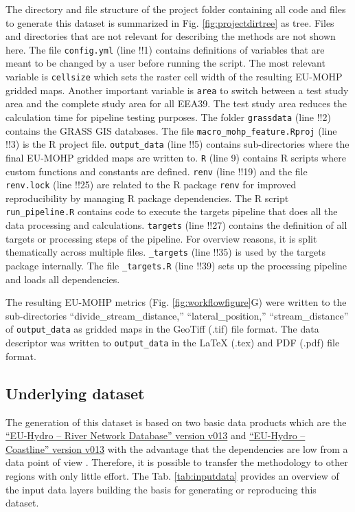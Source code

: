 \documentclass[fleqn,10pt]{wlscirep}
\begin{document}
The directory and file structure of the project folder containing all code and files to generate this dataset is summarized in Fig. \ref{fig:projectdirtree} as tree. Files and directories that are not relevant for describing the methods are not shown here. The file \texttt{config.yml} (line !!1) contains definitions of variables that are meant to be changed by a user before running the script. The most relevant variable is \texttt{cellsize} which sets the raster cell width of the resulting EU-MOHP gridded maps. Another important variable is \texttt{area} to switch between a test study area and the complete study area for all EEA39. The test study area reduces the calculation time for pipeline testing purposes. The folder \texttt{grassdata} (line !!2) contains the GRASS GIS databases. The file \texttt{macro\_mohp\_feature.Rproj} (line !!3) is the R project file. \texttt{output\_data} (line !!5) contains sub-directories where the final EU-MOHP gridded maps are written to. \texttt{R} (line 9) contains R scripts where custom functions and constants are defined. \texttt{renv} (line !!19) and the file \texttt{renv.lock} (line !!25) are related to the R package \texttt{renv} for improved reproducibility by managing R package dependencies. The R script \texttt{run\_pipeline.R} contains code to execute the targets pipeline that does all the data processing and calculations. \texttt{targets} (line !!27) contains the definition of all targets or processing steps of the pipeline. For overview reasons, it is split thematically across multiple files. \texttt{\_targets} (line !!35) is used by the targets package internally. The file \texttt{\_targets.R} (line !!39) sets up the processing pipeline and loads all dependencies.

The resulting EU-MOHP metrics (Fig. \ref{fig:workflowfigure}G) were written to the sub-directories ``divide\_stream\_distance,'' ``lateral\_position,'' ``stream\_distance'' of \texttt{output\_data} as gridded maps in the GeoTiff (.tif) file format. The data descriptor was written to \texttt{output\_data} in the LaTeX (.tex) and PDF (.pdf) file format.

\hypertarget{underlying-dataset}{%
\subsection*{Underlying dataset}\label{underlying-dataset}}

The generation of this dataset is based on two basic data products which are the \href{https://land.copernicus.eu/imagery-in-situ/eu-hydro/eu-hydro-river-network-database?tab=download}{``EU-Hydro -- River Network Database'' version v013} and \href{https://land.copernicus.eu/imagery-in-situ/eu-hydro/eu-hydro-coastline?tab=download}{``EU-Hydro -- Coastline'' version v013} with the advantage that the dependencies are low from a data point of view \cite{noauthor_eu-hydro_2021, noauthor_eu-hydro_2021-1}. Therefore, it is possible to transfer the methodology to other regions with only little effort. The Tab. \ref{tab:inputdata} provides an overview of the input data layers building the basis for generating or reproducing this dataset.
\end{document}
